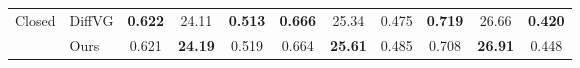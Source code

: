 \begin{table}[!h]
{\begin{tabular}{l|l|ccc|ccc|ccc}
            \midrule
            \multirow{2}{*}{Closed} 
            & DiffVG & \textbf{0.622} & 24.11 & \textbf{0.513}  
                    & \textbf{0.666} & 25.34 & 0.475  
                    & \textbf{0.719} & 26.66 & \textbf{0.420}  \\
            & Ours 
                    & 0.621 & \textbf{24.19} & 0.519 
                    & 0.664 & \textbf{25.61} &0.485 
                    & 0.708 & \textbf{26.91} & 0.448  \\
            \bottomrule
        \end{tabular}
    }
    \label{tab:comparisons_kodak}
\end{table}
